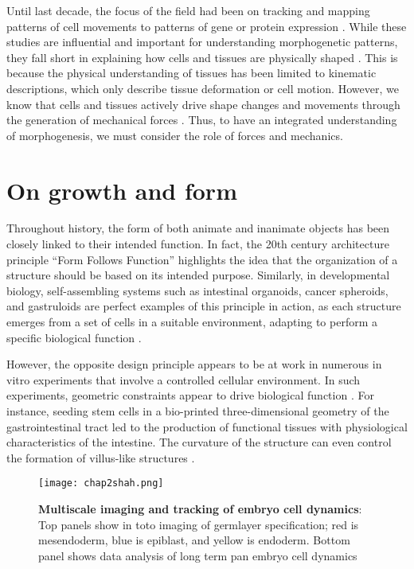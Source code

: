 Until last decade, the focus of the field had been on tracking and mapping patterns of cell movements to patterns of gene or protein expression \cite{gorfinkiel2021}. While these studies are influential and important for understanding morphogenetic patterns, they fall short in explaining how cells and tissues are physically shaped \cite{veenvliet2021, odell1981}. This is because the physical understanding of tissues has been limited to kinematic descriptions, which only describe tissue deformation or cell motion. However, we know that cells and tissues actively drive shape changes and movements through the generation of mechanical forces \cite{lecuit2011}. Thus, to have an integrated understanding of morphogenesis, we must consider the role of forces and mechanics.

\hypertarget{on-growth-and-form}{%
\section{On growth and form}\label{on-growth-and-form}}

Throughout history, the form of both animate and inanimate objects has been closely linked to their intended function. In fact, the 20th century architecture principle ``Form Follows Function'' highlights the idea that the organization of a structure should be based on its intended purpose. Similarly, in developmental biology, self-assembling systems such as intestinal organoids, cancer spheroids, and gastruloids are perfect examples of this principle in action, as each structure emerges from a set of cells in a suitable environment, adapting to perform a specific biological function \cite{gjorevski2016, ishiguro2017, morizane2017, vianello2019}.

However, the opposite design principle appears to be at work in numerous in vitro experiments that involve a controlled cellular environment. In such experiments, geometric constraints appear to drive biological function \cite{xi2018}. For instance, seeding stem cells in a bio-printed three-dimensional geometry of the gastrointestinal tract led to the production of functional tissues with physiological characteristics of
the intestine. The curvature of the structure can even control the formation of villus-like structures \cite{brassard2021}. 

\begin{figure}[h!]
	\centering
	\texttt{[image: chap2shah.png]}
	\caption{\label{fig_2_1} \textbf{Multiscale imaging and tracking of embryo cell dynamics}: Top panels show in toto imaging of germlayer specification; red is mesendoderm, blue is epiblast, and yellow is endoderm. Bottom panel shows data analysis of long term pan embryo cell dynamics \cite{shah2019}}
\end{figure}

